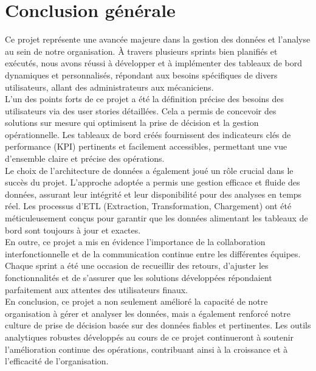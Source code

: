 
\chapter*{Conclusion générale}

Ce projet représente une avancée majeure dans la gestion des données et l'analyse au sein de notre organisation. À travers plusieurs sprints bien planifiés et exécutés, nous avons réussi à développer et à implémenter des tableaux de bord dynamiques et personnalisés, répondant aux besoins spécifiques de divers utilisateurs, allant des administrateurs aux mécaniciens.\\

\noindent L'un des points forts de ce projet a été la définition précise des besoins des utilisateurs via des user stories détaillées. Cela a permis de concevoir des solutions sur mesure qui optimisent la prise de décision et la gestion opérationnelle. Les tableaux de bord créés fournissent des indicateurs clés de performance (KPI) pertinents et facilement accessibles, permettant une vue d'ensemble claire et précise des opérations.\\

\noindent Le choix de l'architecture de données a également joué un rôle crucial dans le succès du projet. L'approche adoptée a permis une gestion efficace et fluide des données, assurant leur intégrité et leur disponibilité pour des analyses en temps réel. Les processus d'ETL (Extraction, Transformation, Chargement) ont été méticuleusement conçus pour garantir que les données alimentant les tableaux de bord sont toujours à jour et exactes.\\

\noindent En outre, ce projet a mis en évidence l'importance de la collaboration interfonctionnelle et de la communication continue entre les différentes équipes. Chaque sprint a été une occasion de recueillir des retours, d'ajuster les fonctionnalités et de s'assurer que les solutions développées répondaient parfaitement aux attentes des utilisateurs finaux.\\

\noindent En conclusion, ce projet a non seulement amélioré la capacité de notre organisation à gérer et analyser les données, mais a également renforcé notre culture de prise de décision basée sur des données fiables et pertinentes. Les outils analytiques robustes développés au cours de ce projet continueront à soutenir l'amélioration continue des opérations, contribuant ainsi à la croissance et à l'efficacité de l'organisation.\\

